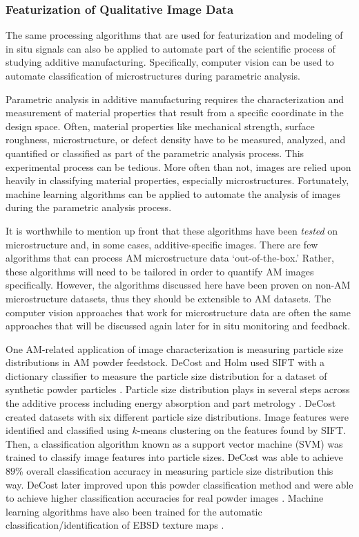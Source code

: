 \subsubsection{Featurization of Qualitative Image Data}
The same processing algorithms that are used for featurization and modeling of in situ signals can also be applied to automate part of the scientific process of studying additive manufacturing. Specifically, computer vision can be used to automate classification of microstructures during parametric analysis.

Parametric analysis in additive manufacturing requires the characterization and measurement of material properties that result from a specific coordinate in the design space. Often, material properties like mechanical strength, surface roughness, microstructure, or defect density have to be measured, analyzed, and quantified or classified as part of the parametric analysis process. This experimental process can be tedious. More often than not, images are relied upon heavily in classifying material properties, especially microstructures. Fortunately, machine learning algorithms can be applied to automate the analysis of images during the parametric analysis process.

It is worthwhile to mention up front that these algorithms have been \textit{tested} on microstructure and, in some cases, additive-specific images. There are few algorithms that can process AM microstructure data `out-of-the-box.' Rather, these algorithms will need to be tailored in order to quantify AM images specifically. However, the algorithms discussed here have been proven on non-AM microstructure datasets, thus they should be extensible to AM datasets. The computer vision approaches that work for microstructure data are often the same approaches that will be discussed again later for in situ monitoring and feedback.

One AM-related application of image characterization is measuring particle size distributions in AM powder feedstock. DeCost and Holm used SIFT with a dictionary classifier to measure the particle size distribution for a dataset of synthetic powder particles \cite{DeCost2017a}. Particle size distribution plays in several steps across the additive process including energy absorption and part metrology \cite{Zhou2009, Boley2015, Boley2016}. DeCost created datasets with six different particle size distributions. Image features were identified and classified using $k$-means clustering on the features found by SIFT. Then, a classification algorithm known as a support vector machine (SVM) was trained to classify image features into particle sizes. DeCost was able to achieve $89$\% overall classification accuracy in measuring particle size distribution this way. DeCost later improved upon this powder classification method and were able to achieve higher classification accuracies for real powder images \cite{DeCost2017}. Machine learning algorithms have also been trained for the automatic classification/identification of EBSD texture maps \cite{Shen2019, Kaufmann2020}.

